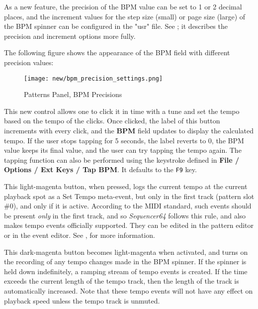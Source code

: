    As a new feature, the precision of the BPM value can be set to 1 or 2
   decimal places, and the increment values for the step size (small)
   or page size (large) of the BPM spinner can be configured in the "usr" file.
   See ; it describes
   the precision and increment options more fully.

   The following figure shows the appearance of the BPM field with different
   precision values:

\begin{figure}[H]
   \centering 
   \texttt{[image: new/bpm\_precision\_settings.png]}
   \caption{Patterns Panel, BPM Precisions}
   \label{fig:pattern_window_bpm_precision_settings.png}
\end{figure}

   This new control allows one to click it in time with a tune and set the
   tempo based on the tempo of the clicks.  Once clicked, the label of this
   button increments with every click, and the \textbf{BPM} field updates to
   display the calculated tempo.  If the user stops tapping for 5 seconds, the
   label reverts to 0, the BPM value keeps its final value, and the user can
   try tapping the tempo again.
   The tapping  function can also be performed using the keystroke defined
   in \textbf{File / Options / Ext Keys / Tap BPM}.  It defaults
   to the \texttt{F9} key.

   This light-magenta button, when pressed, logs the current tempo at the
   current playback spot as a Set Tempo meta-event, but only in the first
   track (pattern slot \#0), and only if it is active.  According to the MIDI 
   standard, such events should be present \textsl{only} in the first track,
   and so \textsl{Sequencer64} follows this rule, and also makes tempo events
   officially supported.  They can be edited in the pattern editor or in the
   event editor.
   See , for more information.

   This dark-magenta button becomes light-magenta when activated, and turns on
   the recording of any tempo changes made in the BPM spinner.  If the spinner
   is held down indefinitely, a ramping stream of tempo events is created.  If
   the time exceeds the current length of the tempo track, then the length of
   the track is automatically increased.
   Note that these tempo events will not have any effect on playback speed
   unless the tempo track is unmuted.

